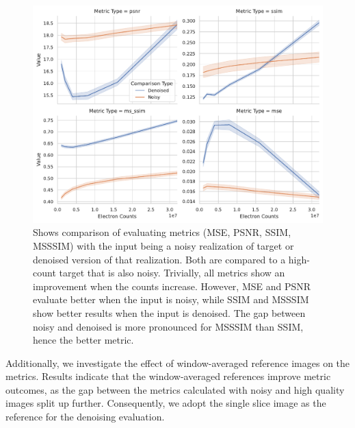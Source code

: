 \begin{figure}
    \centering
    \includegraphics[width=1\linewidth]{images/metrics_comparison_denoised_noisy.pdf}
    \caption{Shows comparison of evaluating metrics (\gls{MSE}, \gls{PSNR}, \gls{SSIM}, \gls{MSSSIM}) with the input being a noisy realization of target or denoised version of that realization. Both are compared to a high-count target that is also noisy. Trivially, all metrics show an improvement when the counts increase. However, \gls{MSE} and \gls{PSNR} evaluate better when the input is noisy, while \gls{SSIM} and \gls{MSSSIM} show better results when the input is denoised. The gap between noisy and denoised is more pronounced for \gls{MSSSIM} than \gls{SSIM}, hence the better metric. }
   \label{fig:metrics-comparison}
\end{figure}

Additionally, we investigate the effect of window-averaged reference images on the metrics. Results indicate that the window-averaged references improve metric outcomes, as the gap between the metrics calculated with noisy and high quality images split up further. Consequently, we adopt the single slice image as the reference for the denoising evaluation.


